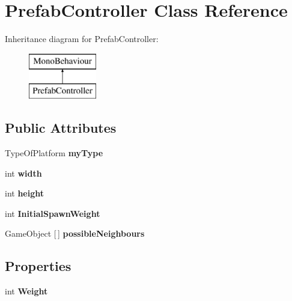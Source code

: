 \hypertarget{class_prefab_controller}{}\section{Prefab\+Controller Class Reference}
\label{class_prefab_controller}
Inheritance diagram for Prefab\+Controller\+:\begin{figure}[H]
\begin{center}
\leavevmode
\includegraphics[height=2.000000cm]{class_prefab_controller}
\end{center}
\end{figure}
\subsection*{Public Attributes}
\begin{DoxyCompactItemize}
\item 
\mbox{\label{class_prefab_controller_a1a75d38e9c15930654004afdf9ee4aee}} 
Type\+Of\+Platform {\bfseries my\+Type}
\item 
\mbox{\label{class_prefab_controller_acbc5e60eabf3b29829474dfcbdd35785}} 
int {\bfseries width}
\item 
\mbox{\label{class_prefab_controller_a9fff80e8498a06ba1068d0b4301735d7}} 
int {\bfseries height}
\item 
\mbox{\label{class_prefab_controller_a6b02d9c07b9b706457460716ab27cc53}} 
int {\bfseries Initial\+Spawn\+Weight}
\item 
\mbox{\label{class_prefab_controller_a2dde0ebabf4575e3466862ee95366d3f}} 
Game\+Object \mbox{[}$\,$\mbox{]} {\bfseries possible\+Neighbours}
\end{DoxyCompactItemize}
\subsection*{Properties}
\begin{DoxyCompactItemize}
\item 
\mbox{\label{class_prefab_controller_ab96405cfeea588d836a744cb7c26f6c9}} 
int {\bfseries Weight}
\end{DoxyCompactItemize}
